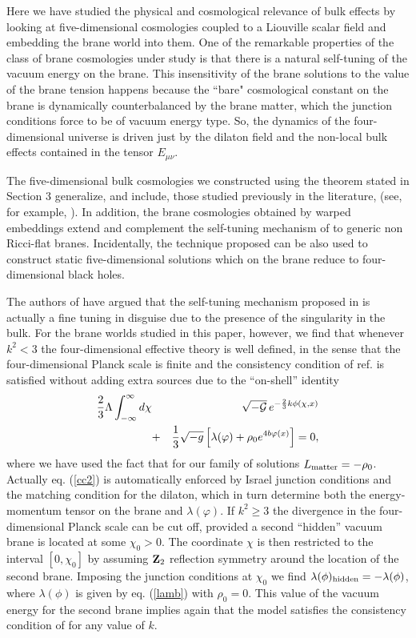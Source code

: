 \documentclass[prd,a4paper,twocolumn,superscriptaddress,nofootinbib,showpacs]{revtex4}
\begin{document}
Here we have studied the physical and cosmological relevance of bulk effects by looking at 
five-dimensional 
cosmologies coupled to a Liouville scalar field and embedding the brane world into them. 
One of the remarkable properties of the class of brane cosmologies under study is that
there is a natural self-tuning of the vacuum energy on the brane. This insensitivity of the brane solutions
to the value of the brane tension happens because the 
``bare" cosmological constant on the brane is dynamically counterbalanced by the brane matter, which
the junction conditions force to be of vacuum energy type. So,
the dynamics of the four-dimensional
universe is driven just by the dilaton field and the non-local bulk effects contained in 
the tensor $E_{\mu\nu}$. 

The five-dimensional bulk cosmologies we constructed using the theorem stated in 
Section 3 generalize, and include, those studied previously in the literature, (see, for example, 
\cite{jim,kach,gjs,ajs,hlz,chsa}).
In addition, the brane cosmologies obtained by warped embeddings extend and complement
the self-tuning mechanism of \cite{kach,nem} to generic non Ricci-flat branes.
Incidentally, the technique proposed can be also used to construct static five-dimensional solutions
which on the brane reduce to four-dimensional black holes.

The authors of \cite{flln,fllnd} have argued that the self-tuning mechanism proposed in \cite{kach} is 
actually a fine tuning in disguise due to the presence of the singularity in the bulk. For the brane worlds
studied in this paper, however, we find that whenever $k^2<3$ the four-dimensional effective theory is well 
defined, in the sense that the four-dimensional Planck scale is finite and the consistency condition 
of ref. \cite{fllnd} is satisfied without adding extra sources due to the ``on-shell'' identity
\begin{eqnarray}
{2\over 3}\Lambda \int_{-\infty}^{\infty}d\chi & & \hspace*{-0.5cm}\sqrt{-\CG}\,e^{-{2\over 3}k\phi(\chi,x)}
\nonumber \\
&+&{1\over 3}\sqrt{-g}\left[\lambda(\varphi)+\rho_{0}e^{4b\varphi(x)}\right]=0,
\label{cc2}
\end{eqnarray}
where we have used the fact that for our family of solutions $L_{\rm matter}=-\rho_{0}$. Actually
eq. (\ref{cc2}) is automatically enforced by Israel junction conditions and the matching condition for the dilaton, 
which in turn determine both the energy-momentum tensor on the brane and $\lambda(\varphi)$.
If $k^2\geq 3$ the divergence in the four-dimensional Planck scale can be cut off,
provided a second ``hidden'' vacuum brane 
is located at some $\chi_{0}>0$. The coordinate $\chi$ is then restricted to the interval $[0,\chi_{0}]$
by assuming ${\bf Z}_{2}$ reflection symmetry around the location of the second brane. Imposing the junction 
conditions at $\chi_{0}$ we find $\lambda(\phi)_{\rm hidden}=-\lambda(\phi)$, where 
$\lambda(\phi)$ is given by eq. (\ref{lamb}) with $\rho_{0}=0$. This value of the 
vacuum energy for the second brane implies again that the model satisfies the consistency condition of \cite{fllnd}
for any value of $k$.
\end{document}
